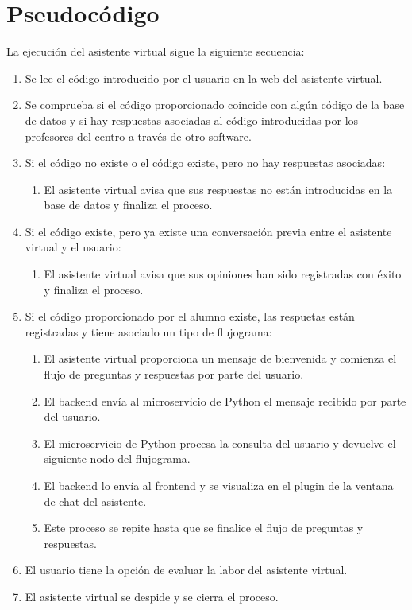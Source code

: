 \section{Pseudocódigo}

La ejecución del asistente virtual sigue la siguiente secuencia:

\begin{enumerate}
    \item Se lee el código introducido por el usuario en la web del asistente virtual.
    \item Se comprueba si el código proporcionado coincide con algún código de la base de datos y si hay respuestas asociadas al código introducidas por los profesores del centro a través de otro software.
    \item Si el código no existe o el código existe, pero no hay respuestas asociadas:
\begin{enumerate}
        \item El asistente virtual avisa que sus respuestas no están introducidas en la base de datos y finaliza el proceso.
\end{enumerate}
    \item Si el código existe, pero ya existe una conversación previa entre el asistente virtual y el usuario:
\begin{enumerate}
        \item El asistente virtual avisa que sus opiniones han sido registradas con éxito y finaliza el proceso.
\end{enumerate}
    \item Si el código proporcionado por el alumno existe, las respuetas están registradas y tiene asociado un tipo de flujograma:
\begin{enumerate}
        \item El asistente virtual proporciona un mensaje de bienvenida y comienza el flujo de preguntas y respuestas por parte del usuario.
        \item El backend envía al microservicio de Python el mensaje recibido por parte del usuario.
        \item El microservicio de Python procesa la consulta del usuario y devuelve el siguiente nodo del flujograma.
        \item El backend lo envía al frontend y se visualiza en el plugin de la ventana de chat del asistente.
        \item Este proceso se repite hasta que se finalice el flujo de preguntas y respuestas.
\end{enumerate}
    \item El usuario tiene la opción de evaluar la labor del asistente virtual.
    \item El asistente virtual se despide y se cierra el proceso.
\end{enumerate}

